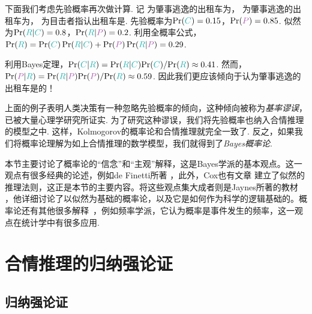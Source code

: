 下面我们考虑先验概率再次做计算. 记  为肇事逃逸的出租车为， 为肇事逃逸的出租车为， 为目击者指认出租车是. 先验概率为$\Pr(\contrastlight{C}) = 0.15$，$\Pr(\light{P}) = 0.85$. 似然为$\Pr(\contrastlight{R}|\contrastlight{C}) = 0.8$，$\Pr(\contrastlight{R}|\light{P}) = 0.2$. 利用全概率公式，$\Pr(\contrastlight{R}) = \Pr(\contrastlight{C})\Pr(\contrastlight{R}|\contrastlight{C}) + \Pr(\light{P})\Pr(\contrastlight{R}|\light{P}) = 0.29$. 
 
利用Bayes定理，$\Pr(\contrastlight{C}|\contrastlight{R}) = \Pr(\contrastlight{R}|\contrastlight{C}){\Pr(\contrastlight{C})}/{\Pr(\contrastlight{R})} \approx 0.41$. 然而，$\Pr(\light{P}|\contrastlight{R}) = \Pr(\contrastlight{R}|\light{P}){\Pr(\light{P})}/{\Pr(\contrastlight{R})} \approx 0.59$. 因此我们更应该倾向于认为肇事逃逸的出租车是的！

上面的例子表明人类决策有一种忽略先验概率的倾向，这种倾向被称为\textit{基率谬误}，已被大量心理学研究所证实\cite{kahnemanPsychologyPrediction1973,tverskyJudgmentUncertaintyHeuristics1974,bar-hillelBaserateFallacyProbability1980}. 为了研究这种谬误，我们将先验概率也纳入合情推理的模型之中. 这样，Kolmogorov的概率论和合情推理就完全一致了. 反之，如果我们将概率论理解为如上合情推理的数学模型，我们就得到了\textit{Bayes概率论}.

\begin{remark}
    本节主要讨论了概率论的“信念”和“主观”解释，这是Bayes学派的基本观点。这一观点有很多经典的论述，例如de Finetti所著 \cite{definettiTheoryProbabilityCritical2017}，此外，Cox也有文章 \cite{coxProbabilityFrequencyReasonable1946} 建立了似然的推理法则，这正是本节的主要内容。将这些观点集大成者则是Jaynes所著的教材 \cite{jaynesProbabilityTheoryLogic2002}，他详细讨论了以似然为基础的概率论，以及它是如何作为科学的逻辑基础的。概率论还有其他很多解释~\cite{hajekInterpretationsProbability2023}，例如频率学派，它认为概率是事件发生的频率，这一观点在统计学中有很多应用.
\end{remark}

\section{合情推理的归纳强论证}

\subsection{归纳强论证}\label{subsec:inductive-strong-argument}


